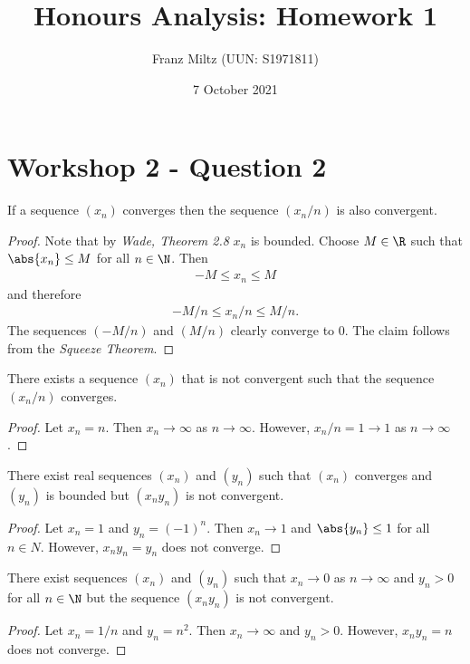 \documentclass{article}
\begin{document}
\title{Honours Analysis: Homework 1}
\author{Franz Miltz (UUN: S1971811)}
\date{7 October 2021}
\maketitle

\section{Workshop 2 - Question 2}

\begin{claim}
	If a sequence $(x_n)$ converges then the sequence $(x_n/n)$ is also convergent.
\end{claim}
\begin{proof}
	Note that by \emph{Wade, Theorem 2.8} $x_n$ is bounded. Choose $M\in\R$ such that
	$\abs{x_n}\leq M$ for all $n\in\N$. Then
	\begin{align*}
		-M \leq x_n \leq M
	\end{align*}
	and therefore
	\begin{align*}
		-M/n \leq x_n / n \leq M/n.
	\end{align*}
	The sequences $(-M/n)$ and $(M/n)$ clearly converge to $0$. The claim follows from the
	\emph{Squeeze Theorem}.
\end{proof}

\begin{claim}
	There exists a sequence $(x_n)$ that is not convergent such that the sequence $(x_n/n)$ converges.
\end{claim}
\begin{proof}
	Let $x_n=n$. Then $x_n\to\infty$ as $n\to\infty$. However,
	$x_n/n=1 \to 1$ as $n\to\infty$.
\end{proof}

\begin{claim}
	There exist real sequences $(x_n)$ and $(y_n)$ such that $(x_n)$ converges and $(y_n)$
	is bounded but $(x_ny_n)$ is not convergent.
\end{claim}
\begin{proof}
	Let $x_n=1$ and $y_n=(-1)^n$. Then $x_n\to 1$ and $\abs{y_n}\leq 1$ for all $n\in N$.
	However, $x_ny_n=y_n$ does not converge.
\end{proof}

\begin{claim}
	There exist sequences $(x_n)$ and $(y_n)$ such that $x_n\to 0$ as $n\to\infty$ and $y_n>0$
	for all $n\in\N$ but the sequence $(x_ny_n)$ is not convergent.
\end{claim}
\begin{proof}
	Let $x_n=1/n$ and $y_n=n^2$. Then $x_n\to\infty$ and $y_n>0$. However,
	$x_ny_n=n$ does not converge.
\end{proof}
\end{document}
